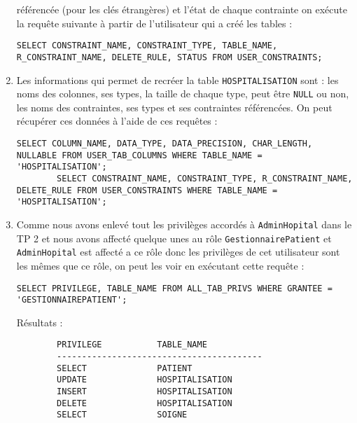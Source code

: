 \documentclass[12pt,a4paper]{article}
\begin{document}
\begin{enumerate}
	référencée (pour les clés étrangères) et l'état de chaque contrainte on exécute la requête suivante à partir de l'utilisateur
	qui a créé les tables :
	\begin{lstlisting}[style=OracleSQL]
		SELECT CONSTRAINT_NAME, CONSTRAINT_TYPE, TABLE_NAME, R_CONSTRAINT_NAME, DELETE_RULE, STATUS FROM USER_CONSTRAINTS;
	\end{lstlisting}
	\item Les informations qui permet de recréer la table \texttt{HOSPITALISATION} sont : les noms des colonnes, ses types, la taille
	de chaque type, peut être \texttt{NULL} ou non, les noms des contraintes, ses types et ses contraintes référencées. On peut
	récupérer ces données à l'aide de ces requêtes :
	\begin{lstlisting}[style=OracleSQL]
		SELECT COLUMN_NAME, DATA_TYPE, DATA_PRECISION, CHAR_LENGTH, NULLABLE FROM USER_TAB_COLUMNS WHERE TABLE_NAME = 'HOSPITALISATION';
		SELECT CONSTRAINT_NAME, CONSTRAINT_TYPE, R_CONSTRAINT_NAME, DELETE_RULE FROM USER_CONSTRAINTS WHERE TABLE_NAME = 'HOSPITALISATION';
	\end{lstlisting}
	\item Comme nous avons enlevé tout les privilèges accordés à \texttt{AdminHopital} dans le TP 2 et nous avons affecté quelque unes
	au rôle \texttt{GestionnairePatient} et \texttt{AdminHopital} est affecté a ce rôle donc les privilèges de cet utilisateur sont
	les mêmes que ce rôle, on peut les voir en exécutant cette requête :
	\begin{lstlisting}[style=OracleSQL]
		SELECT PRIVILEGE, TABLE_NAME FROM ALL_TAB_PRIVS WHERE GRANTEE = 'GESTIONNAIREPATIENT';
	\end{lstlisting}
	Résultats :
	\begin{verbatim}
		PRIVILEGE           TABLE_NAME
		-----------------------------------------
		SELECT              PATIENT
		UPDATE              HOSPITALISATION
		INSERT              HOSPITALISATION
		DELETE              HOSPITALISATION
		SELECT              SOIGNE
	\end{verbatim}
\end{enumerate}
\end{document}
